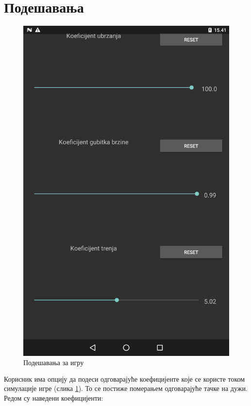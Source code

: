\section{Подешавања}\label{UseCases:Settings}
\begin{figure}[htb!]
\begin{center}
\includegraphics[scale=.1]{pictures/settings/basic}
\caption{Подешавања за игру}\label{fig:settingsBasic}
\end{center}
\end{figure}
Корисник има опцију да подеси одговарајуће коефицијенте  које се користе током симулације игре (слика \ref{fig:settingsBasic}). То се постиже померањем одговарајуће тачке на дужи. Редом су наведени коефицијенти:
